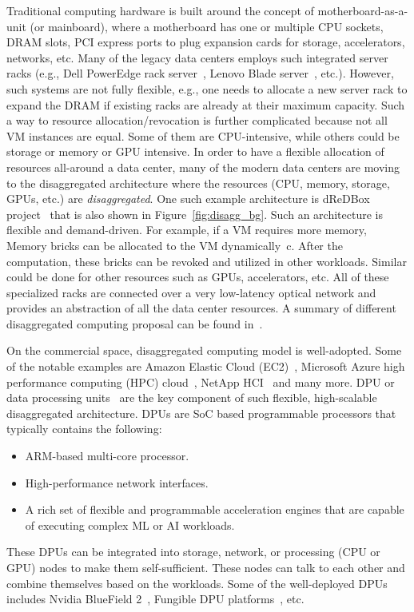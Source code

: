 Traditional computing hardware is built around the concept of motherboard-as-a-unit (or mainboard), where a motherboard has one or multiple CPU sockets, DRAM slots, PCI express ports to plug expansion cards for storage, accelerators, networks, etc. Many of the legacy data centers employs such integrated server racks  (e.g., Dell PowerEdge rack server~\cite{rack_server_dell}, Lenovo Blade server~\cite{rack_server_lenovo}, etc.). However, such systems are not fully flexible, e.g., one needs to allocate a new server rack to expand the DRAM if existing racks are already at their maximum capacity. Such a way to resource allocation/revocation is further complicated because not all VM instances are equal. Some of them are CPU-intensive, while others could be storage or memory or GPU intensive. In order to have a flexible allocation of resources all-around a data center, many of the modern data centers are moving to the disaggregated architecture where the resources (CPU, memory, storage, GPUs, etc.) are \emph{disaggregated}. One such example architecture is dReDBox project~\cite{dis1,dis2} that is also shown in Figure~\ref{fig:disagg_bg}. Such an architecture is flexible and demand-driven. For example, if a VM requires more memory, Memory bricks can be allocated to the VM dynamically~c\cite{lim2009disaggregated}. After the computation, these bricks can be revoked and utilized in other workloads. Similar could be done for other resources such as GPUs, accelerators, etc. All of these specialized racks are connected over a very low-latency optical network and provides an abstraction of all the data center resources. A summary of different disaggregated computing proposal can be found in~\cite{meyer2017disaggregated}.

On the commercial space, disaggregated computing model is well-adopted. Some of the notable examples are Amazon Elastic Cloud (EC2)~\cite{ec2}, Microsoft Azure high performance computing (HPC) cloud~\cite{azure}, NetApp HCI~\cite{netapp} and many more. DPU or data processing units~\cite{dpu} are the key component of such flexible, high-scalable disaggregated architecture. DPUs are SoC based programmable processors that typically contains the following:

\begin{itemize}
  \item ARM-based multi-core processor.
  \item High-performance network interfaces. 
  \item A rich set of flexible and programmable acceleration engines that are capable of executing complex ML or AI workloads.
\end{itemize}

These DPUs can be integrated into storage, network, or processing (CPU or GPU) nodes to make them self-sufficient. These nodes can talk to each other and combine themselves based on the workloads. Some of the well-deployed DPUs includes Nvidia BlueField 2~\cite{bluefield}, Fungible DPU platforms~\cite{fungible}, etc.